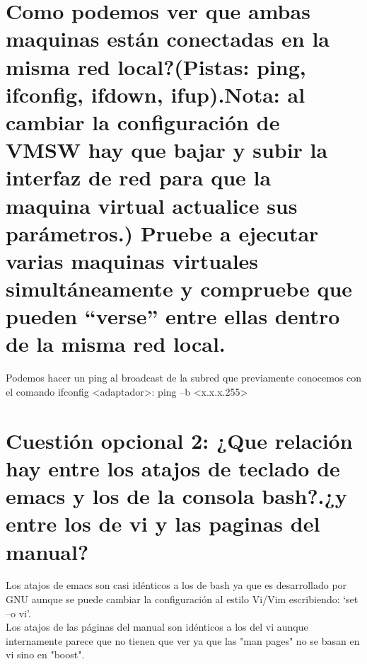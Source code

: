 \section{Como podemos ver que ambas maquinas están conectadas en la misma red local?(Pistas: ping, ifconfig, ifdown, ifup).Nota: al cambiar la configuración de VMSW hay que bajar y subir la interfaz de red para que la maquina virtual actualice sus parámetros.) Pruebe a ejecutar varias maquinas virtuales simultáneamente y compruebe que pueden “verse” entre ellas dentro de la misma red local.}

Podemos hacer un ping al broadcast de la subred que previamente conocemos con el comando ifconfig <adaptador>: ping –b <x.x.x.255>\\
	
	
	
	
	
\section{Cuestión opcional 2: ¿Que relación hay entre los atajos de teclado de emacs y los de la consola bash?.¿y entre los de vi y las paginas del manual?}

Los atajos de emacs son casi idénticos a los de bash ya que es desarrollado por GNU aunque se puede cambiar la configuración al estilo Vi/Vim escribiendo:  ‘set –o vi’.\\

Los atajos de las páginas del manual son idénticos a los del vi aunque internamente parece que no tienen que ver ya que las "man pages" no se basan en vi sino en "boost".





\clearpage



